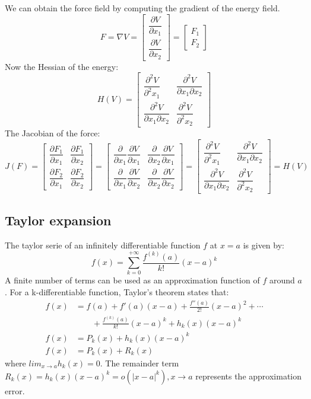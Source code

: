 \documentclass{article}
\begin{document}
We can obtain the force field by computing the gradient of the energy field.
\[
    F = \nabla V =
    \begin{bmatrix}
        \dfrac{\partial V}{\partial x_1} \\
        \dfrac{\partial V}{\partial x_2}
    \end{bmatrix} = 
    \begin{bmatrix} F_1 \\ F_2 \end{bmatrix}
\]
Now the Hessian of the energy:
\[
    H(V) =
    \begin{bmatrix}
        \dfrac{\partial^2 V}{\partial^2 x_1} &
        \dfrac{\partial^2 V}{\partial x_1 \partial x_2}  \\
        \dfrac{\partial^2 V}{\partial x_1 \partial x_2} &
        \dfrac{\partial^2 V}{\partial^2 x_2}
    \end{bmatrix}
\]
The Jacobian of the force:
\[
    J(F) =
    \begin{bmatrix}
        \dfrac{\partial F_1}{\partial x_1} & \dfrac{\partial F_1}{\partial x_2} \\ 
        \dfrac{\partial F_2}{\partial x_1} & \dfrac{\partial F_2}{\partial x_2}
    \end{bmatrix} = 
    \begin{bmatrix}
        \dfrac{\partial}{\partial x_1} \dfrac{\partial V}{\partial x_1} &
        \dfrac{\partial}{\partial x_2} \dfrac{\partial V}{\partial x_1} \\ 
        \dfrac{\partial}{\partial x_1} \dfrac{\partial V}{\partial x_2} &
        \dfrac{\partial}{\partial x_2} \dfrac{\partial V}{\partial x_2}
    \end{bmatrix} = 
    \begin{bmatrix}
        \dfrac{\partial^2 V}{\partial^2 x_1} & \dfrac{\partial^2 V}{\partial x_1 \partial x_2}  \\ 
        \dfrac{\partial^2 V}{\partial x_1 \partial x_2} & \dfrac{\partial^2 V}{\partial^2 x_2}
    \end{bmatrix} = H(V)
\]
\subsection{Taylor expansion}
The taylor serie of an infinitely differentiable function $f$ at $x=a$ is given by:
\[
f(x) = \sum_{k=0}^{+\infty} \frac{f^{(k)}(a)}{k!}(x-a)^k
\]
A finite number of terms can be used as an approximation function of $f$ around $a$.
For a k-differentiable function, Taylor's theorem states that:
\begin{align*}
    f(x) &= f(a) + f'(a)(x-a) + \frac{f''(a)}{2!}(x-a)^2 + \cdots \\ &\qquad {} +\frac{f^{(k)}(a)}{k!}(x-a)^k + h_k(x)(x-a)^k \\
    f(x) &= P_k(x) + h_k(x)(x-a)^k \\
    f(x) &= P_k(x) + R_k(x)
\end{align*} where $lim_{x\to a}h_k(x)=0$. \newline
The remainder term $R_k(x) = h_k(x)(x-a)^k = o(|x-a|^k),  x \longrightarrow a$ represents the approximation error.
\end{document}
